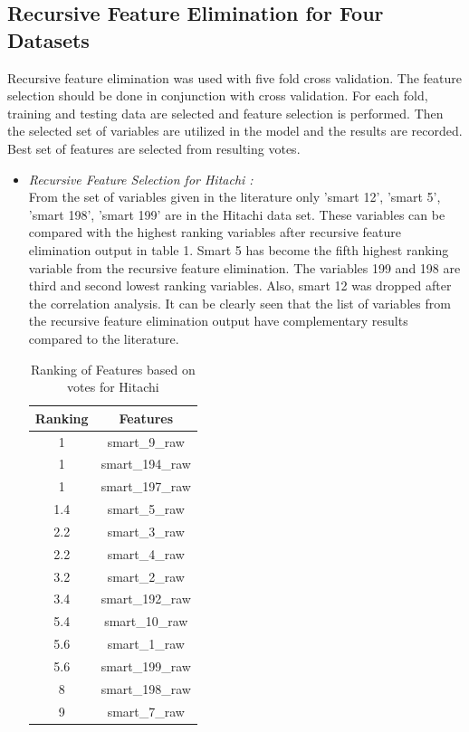 \documentclass[conference]{IEEEtran}
\begin{document}
\subsection{Recursive Feature Elimination for Four Datasets}

Recursive feature elimination was used with five fold cross validation. The feature selection should be done in conjunction with cross validation. For each fold, training and testing data are selected and feature selection is performed. Then the selected set of variables are utilized in the model and the results are recorded. Best set of features are selected from resulting votes. 

\begin{itemize}

    \item \textit{Recursive Feature Selection for Hitachi :}\\
    From the set of variables given in the literature \cite{b13} only 'smart 12', 'smart 5', 'smart 198', 'smart 199' are in the Hitachi data set. These variables can be compared with the highest ranking variables after recursive feature elimination output in table 1. Smart 5 has become the fifth highest ranking variable from the recursive feature elimination. The variables 199 and 198 are third and second lowest ranking variables. Also, smart 12 was dropped after the correlation analysis. It can be clearly seen that the list of variables from the recursive feature elimination output have complementary results compared to the literature.\\ 
    \begin{table}[h]
    \caption{Ranking of Features based on votes for Hitachi}
    \label{table_example}
    \begin{center}
    \begin{tabular}{|c||c|}
    \hline
    \textbf{Ranking} & \textbf{Features}\\ \hline
    1 & smart\_9\_raw\\\hline
    1 & smart\_194\_raw\\\hline
    1 & smart\_197\_raw\\\hline
    1.4 & smart\_5\_raw\\\hline
    2.2 & smart\_3\_raw\\\hline
    2.2 & smart\_4\_raw\\\hline
    3.2 & smart\_2\_raw\\\hline
    3.4 & smart\_192\_raw\\\hline
    5.4 & smart\_10\_raw\\\hline
    5.6 & smart\_1\_raw\\\hline
    5.6 & smart\_199\_raw\\\hline
    8 & smart\_198\_raw\\\hline
    9 & smart\_7\_raw\\\hline
    \end{tabular}
    \end{center}
    \end{table}


\end{itemize}
\end{document}

